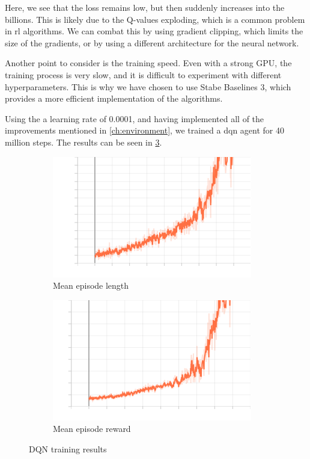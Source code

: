 Here, we see that the loss remains low, but then suddenly increases into the
billions. This is likely due to the Q-values exploding, which is a common
problem in \gls{rl} algorithms. We can combat this by using gradient clipping,
which limits the size of the gradients, or by using a different architecture
for the neural network.

Another point to consider is the training speed. Even with a strong GPU, the
training process is very slow, and it is difficult to experiment with different
hyperparameters. This is why we have chosen to use Stabe Baselines 3, which
provides a more efficient implementation of the algorithms.

Using the a learning rate of 0.0001, and having implemented all of the
improvements mentioned in \cref{ch:environment}, we trained a \gls{dqn} agent
for 40 million steps. The results can be seen in \cref{fig:dqn}.

\begin{figure}[H]
    \begin{subfigure}{0.45\textwidth}
        \centering
        \includegraphics[width=\textwidth]{img/dqn_len_mean.png}
        \caption{Mean episode length}
        \label{fig:dqn_len_mean}
    \end{subfigure}
    \begin{subfigure}{0.45\textwidth}
        \centering
        \includegraphics[width=\textwidth]{img/dqn_rew_mean.png}
        \caption{Mean episode reward}
        \label{fig:dqn_reward_mean}
    \end{subfigure}
    \caption{DQN training results}
    \label{fig:dqn}
\end{figure}

